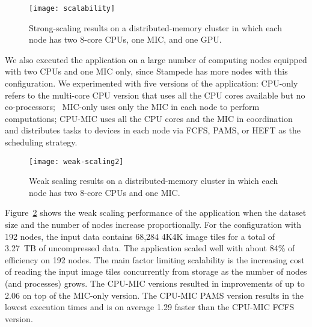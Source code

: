 \begin{figure}[h!]
	\centering
	\texttt{[image: scalability]}
	\vspace{-1ex}
	\caption{Strong-scaling results on a distributed-memory cluster in which each 
	node has two 8-core CPUs, one MIC, and one GPU.}
	\label{fig:scalability}
	\vspace{-2ex}
\end{figure}


We also executed the application on a large number of computing nodes equipped 
with two CPUs and one MIC only, since Stampede has more nodes with this configuration.
We experimented with five versions of the application:
CPU-only refers to the multi-core CPU version that uses all the 
CPU cores available but no co-processors; ~MIC-only uses only the MIC 
in each node to perform computations;
CPU-MIC uses all the CPU cores and the MIC in coordination and 
distributes tasks to devices in each node via FCFS, PAMS, or HEFT as
the scheduling strategy.  
\begin{figure}[htb!]
\begin{center}
	\texttt{[image: weak-scaling2]}\vspace*{-1ex}
	\caption{Weak scaling results on a distributed-memory cluster in which each node 
	has 	two 8-core CPUs and one MIC.}
	\vspace*{-2ex}
\label{fig:weak-scale-general}
\end{center}
\end{figure}

Figure~\ref{fig:weak-scale-general} shows the weak scaling performance of 
the application when the
dataset size and the number of nodes increase proportionally. For the
configuration with 192 nodes, the input data contains 68,284 4K4K image
tiles for a total of 3.27~TB of uncompressed data. The application
scaled well with about 84\% of efficiency on 192 nodes. The main factor limiting scalability is the
increasing cost of reading the input image tiles concurrently from storage as the
number of nodes (and processes) grows. The CPU-MIC versions resulted in improvements of 
up to 2.06 on top of the MIC-only version. 
The CPU-MIC PAMS version results in the lowest execution times and is 
on average 1.29 faster than the CPU-MIC FCFS version. 


